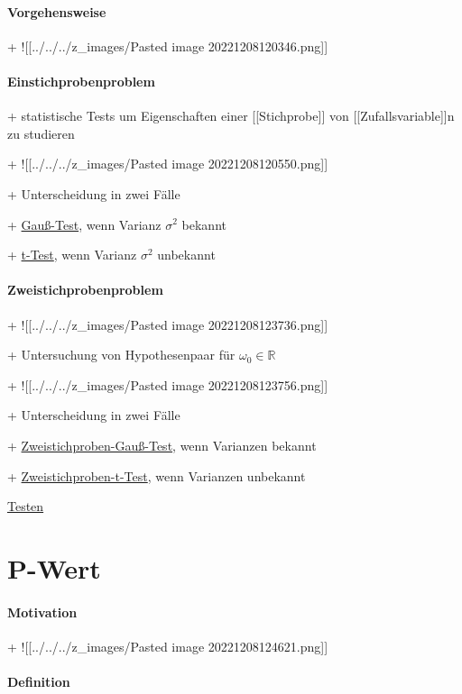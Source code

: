 \documentclass[10pt]{report}
\begin{document}
\subsubsection{Vorgehensweise}

+ ![[../../../z\_images/Pasted image 20221208120346.png]]


\subsubsection{Einstichprobenproblem}

+ statistische Tests um Eigenschaften einer [[Stichprobe]] von [[Zufallsvariable]]n zu studieren

+ ![[../../../z\_images/Pasted image 20221208120550.png]]

+ Unterscheidung in zwei Fälle

+ \hyperref[ch:Gauß-Test]{Gauß-Test}, wenn Varianz $\sigma^2$ bekannt

+ \hyperref[ch:T-Test]{t-Test}, wenn Varianz $\sigma^2$ unbekannt


\subsubsection{Zweistichprobenproblem}

+ ![[../../../z\_images/Pasted image 20221208123736.png]]

+ Untersuchung von Hypothesenpaar für $\omega_0∈ℝ$

+ ![[../../../z\_images/Pasted image 20221208123756.png]]

+ Unterscheidung in zwei Fälle

+ \hyperref[ch:Zweistichproben-Gauß-Test]{Zweistichproben-Gauß-Test}, wenn Varianzen bekannt

+ \hyperref[ch:Zweistichproben-T-Test]{Zweistichproben-t-Test}, wenn Varianzen unbekannt


\hyperref[ch:Testen]{Testen}
\chapter{P-Wert}\label{ch:P-Wert}

\subsubsection{Motivation}

+ ![[../../../z\_images/Pasted image 20221208124621.png]]


\subsubsection{Definition}
\end{document}
